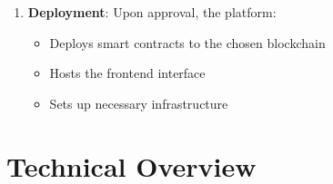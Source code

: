 \documentclass[12pt,a4paper]{article}
\begin{document}
\begin{enumerate}
    
    \item \textbf{Deployment}: Upon approval, the platform:
    \begin{itemize}
        \item Deploys smart contracts to the chosen blockchain
        \item Hosts the frontend interface
        \item Sets up necessary infrastructure
    \end{itemize}
    
\end{enumerate}










\section{Technical Overview}
\label{sec:literature}
\end{document}
